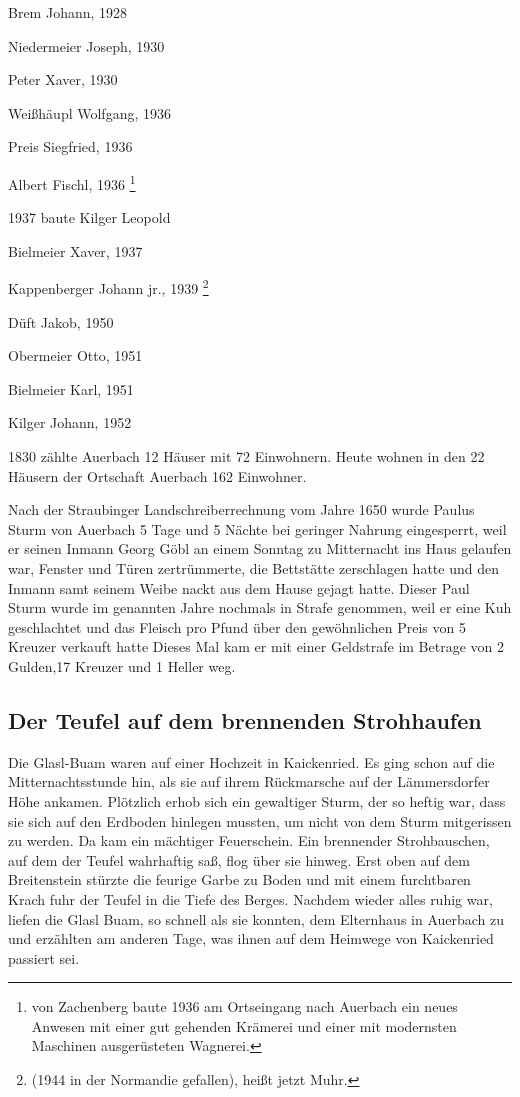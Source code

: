 \documentclass[12pt,a4pager,draft]{book}
\begin{document}
\begin{compactitem}
\item Brem Johann, 1928
\item Niedermeier Joseph, 1930
\item Peter Xaver, 1930
\item Weißhäupl Wolfgang, 1936
\item Preis Siegfried, 1936
\item Albert Fischl, 1936 \footnote{von Zachenberg baute 1936 am Ortseingang nach
Auerbach ein neues Anwesen mit einer gut gehenden Krämerei und einer mit
modernsten Maschinen ausgerüsteten Wagnerei.}
\item 1937 baute Kilger Leopold
\item Bielmeier Xaver, 1937
\item Kappenberger Johann jr., 1939 \footnote{(1944 in der Normandie gefallen),
heißt jetzt Muhr.}
\item Düft Jakob, 1950
\item Obermeier Otto, 1951
\item Bielmeier Karl, 1951
\item Kilger Johann, 1952
\end{compactitem}

1830 zählte Auerbach 12 Häuser mit 72 Einwohnern. Heute wohnen in den 22 Häusern
der Ortschaft Auerbach 162 Einwohner.

Nach der Straubinger Landschreiberrechnung vom Jahre 1650 wurde Paulus Sturm von
Auerbach 5 Tage und 5 Nächte bei geringer Nahrung eingesperrt, weil er seinen
Inmann Georg Göbl an einem Sonntag zu Mitternacht ins Haus gelaufen war, Fenster
und Türen zertrümmerte, die Bettstätte zerschlagen hatte und den Inmann samt
seinem Weibe nackt aus dem Hause gejagt hatte. Dieser Paul Sturm wurde im
genannten Jahre nochmals in Strafe genommen, weil er eine Kuh geschlachtet und
das Fleisch pro Pfund über den gewöhnlichen Preis von 5 Kreuzer verkauft hatte
Dieses Mal kam er mit einer Geldstrafe im Betrage von 2 Gulden,17 Kreuzer und 1
Heller weg.

\subsection{Der Teufel auf dem brennenden Strohhaufen}

Die Glasl-Buam waren auf einer Hochzeit in Kaickenried. Es ging schon auf die
Mitternachtsstunde hin, als sie auf ihrem Rückmarsche auf der Lämmersdorfer Höhe
ankamen. Plötzlich erhob sich ein gewaltiger Sturm, der so heftig war, dass sie
sich auf den Erdboden hinlegen mussten, um nicht von dem Sturm mitgerissen zu
werden. Da kam ein mächtiger Feuerschein. Ein brennender Strohbauschen, auf dem
der Teufel wahrhaftig saß, flog über sie hinweg. Erst oben auf dem Breitenstein
stürzte die feurige Garbe zu Boden und mit einem furchtbaren Krach fuhr der
Teufel in die Tiefe des Berges. Nachdem wieder alles ruhig war, liefen die Glasl
Buam, so schnell als sie konnten, dem Elternhaus in Auerbach zu und erzählten am
anderen Tage, was ihnen auf dem Heimwege von Kaickenried passiert sei.
\end{document}
